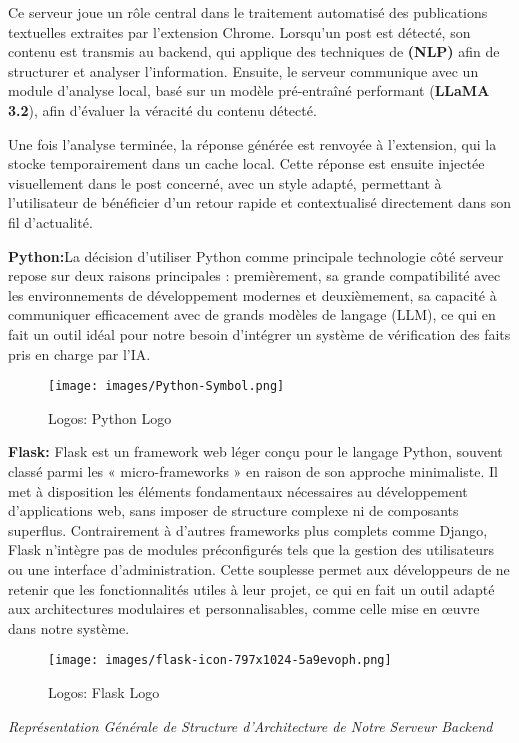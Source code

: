 Ce serveur joue un rôle central dans le traitement automatisé des publications textuelles extraites par l'extension Chrome. Lorsqu'un post est détecté, son contenu est transmis au backend, qui applique des techniques de \textbf{(NLP)} afin de structurer et analyser l'information. Ensuite, le serveur communique avec un module d'analyse local, basé sur un modèle pré-entraîné performant (\textbf{LLaMA 3.2}), afin d'évaluer la véracité du contenu détecté.

Une fois l'analyse terminée, la réponse générée est renvoyée à l'extension, qui la stocke temporairement dans un cache local. Cette réponse est ensuite injectée visuellement dans le post concerné, avec un style adapté, permettant à l'utilisateur de bénéficier d'un retour rapide et contextualisé directement dans son fil d'actualité.
\begin{description}
\item\textbf{Python:}\newline La décision d'utiliser Python comme principale technologie côté serveur repose sur deux raisons principales : premièrement, sa grande compatibilité avec les environnements de développement modernes et deuxièmement, sa capacité à communiquer efficacement avec de grands modèles de langage (LLM), ce qui en fait un outil idéal pour notre besoin d'intégrer un système de vérification des faits pris en charge par l'IA. 
\begin{figure}[H]
    \centering
    \texttt{[image: images/Python-Symbol.png]} 
    \caption{Logos: Python Logo } %
    \label{fig:logos} %
\end{figure}
\item\textbf{Flask:}\newline
Flask est un framework web léger conçu pour le langage Python, souvent classé parmi les « micro-frameworks » en raison de son approche minimaliste. Il met à disposition les éléments fondamentaux nécessaires au développement d’applications web, sans imposer de structure complexe ni de composants superflus. Contrairement à d'autres frameworks plus complets comme Django, Flask n’intègre pas de modules préconfigurés tels que la gestion des utilisateurs ou une interface d’administration. Cette souplesse permet aux développeurs de ne retenir que les fonctionnalités utiles à leur projet, ce qui en fait un outil adapté aux architectures modulaires et personnalisables, comme celle mise en œuvre dans notre système.
\begin{figure}[H]
    \centering
    \texttt{[image: images/flask-icon-797x1024-5a9evoph.png]} 
    \caption{Logos: Flask Logo } %
    \label{fig:logos} %
\end{figure}
\begin{description}
\item \textit{Représentation Générale de Structure d'Architecture de Notre Serveur Backend}


\end{description}
\end{description}
